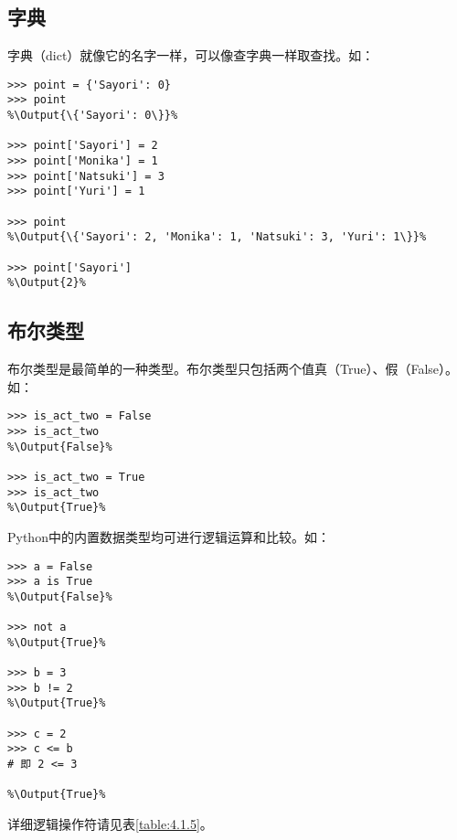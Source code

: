 \subsection{字典}
字典（dict）就像它的名字一样，可以像查字典一样取查找。如：
\begin{lstlisting}
>>> point = {'Sayori': 0}
>>> point
%\Output{\{'Sayori': 0\}}%

>>> point['Sayori'] = 2
>>> point['Monika'] = 1
>>> point['Natsuki'] = 3
>>> point['Yuri'] = 1

>>> point
%\Output{\{'Sayori': 2, 'Monika': 1, 'Natsuki': 3, 'Yuri': 1\}}%

>>> point['Sayori']
%\Output{2}%
\end{lstlisting}

\subsection{布尔类型}
布尔类型是最简单的一种类型。布尔类型只包括两个值真（True）、假（False）。如：
\begin{lstlisting}
>>> is_act_two = False
>>> is_act_two
%\Output{False}%

>>> is_act_two = True
>>> is_act_two
%\Output{True}%
\end{lstlisting}

Python中的内置数据类型均可进行逻辑运算和比较。如：
\begin{lstlisting}
>>> a = False
>>> a is True
%\Output{False}%

>>> not a
%\Output{True}%

>>> b = 3
>>> b != 2
%\Output{True}%

>>> c = 2
>>> c <= b
# 即 2 <= 3

%\Output{True}%
\end{lstlisting}
详细逻辑操作符请见表\ref{table:4.1.5}。

